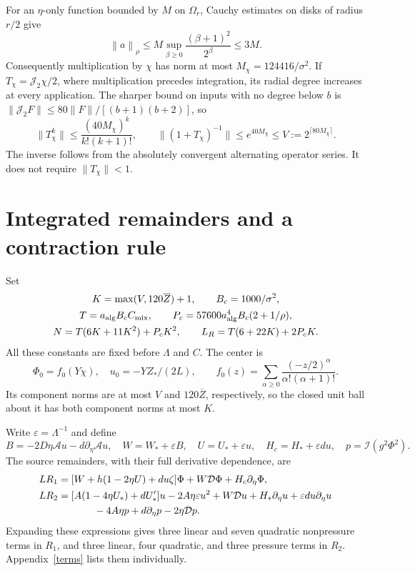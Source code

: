 \documentclass[11pt]{article}
\newcommand{\norm}[1]{\left\lVert#1\right\rVert_\rho}
\newcommand{\Av}{\mathcal A}
\newcommand{\DY}{\mathcal D}
\newcommand{\J}{\mathcal J}
\newcommand{\Int}{\mathcal I}
\begin{document}
For an $\eta$-only function bounded by $M$ on $\Omega_r$, Cauchy estimates
on disks of radius $r/2$ give
\[
\norm{a}\le M\sup_{\beta\ge0}\frac{(\beta+1)^2}{2^\beta}\le3M.
\]
Consequently multiplication by $\chi$ has norm at most
$M_\chi=124416/\sigma^2$. If $T_\chi=\J_2\chi/2$, where multiplication
precedes integration, its radial degree increases at every application.
The sharper bound on inputs with no degree below $b$ is
$\|\J_2F\|\le80\|F\|/[(b+1)(b+2)]$, so
\[
\|T_\chi^k\|\le\frac{(40M_\chi)^k}{k!(k+1)!},\qquad
\|(1+T_\chi)^{-1}\|\le e^{40M_\chi}\le V:=2^{\lceil80M_\chi\rceil}.
\]
The inverse follows from the absolutely convergent alternating operator
series. It does not require $\|T_\chi\|<1$.

\section{Integrated remainders and a contraction rule}
Set
\begin{equation}\label{constants}
\begin{gathered}
K=\max(V,120\overline Z)+1,\qquad B_c=1000/\sigma^2,\\
T=a_{\rm alg}B_c C_{\rm mix},\qquad
P_c=57600a_{\rm alg}^4B_c(2+1/\rho),\\
N=T(6K+11K^2)+P_cK^2,\qquad
L_R=T(6+22K)+2P_cK.
\end{gathered}
\end{equation}
All these constants are fixed before $\Lambda$ and $C$.
The center is
\[
\Phi_0=f_0(Y\chi),\quad u_0=-YZ_*/(2L),\qquad
f_0(z)=\sum_{\alpha\ge0}\frac{(-z/2)^\alpha}{\alpha!(\alpha+1)!}.
\]
Its component norms are at most $V$ and $120\overline Z$, respectively,
so the closed unit ball about it has both component norms at most $K$.

Write $\varepsilon=\Lambda^{-1}$ and define
\[
B=-2D\eta\Av u-d\partial_\eta\Av u,\quad
W=W_*+\varepsilon B,\quad U=U_*+\varepsilon u,\quad
H_c=H_*+\varepsilon du,\quad p=\Int(g^2\Phi^2).
\]
The source remainders, with their full derivative dependence, are
\begin{align}
LR_1={}&[W+h(1-2\eta U)+du\zeta]\Phi+W\DY\Phi+H_c\partial_\eta\Phi,
\label{r1}\\
LR_2={}&[A(1-4\eta U_*)+dU_*']u-2A\eta\varepsilon u^2
+W\DY u+H_*\partial_\eta u+\varepsilon du\partial_\eta u\notag\\
&\hspace{8mm}-4A\eta p+d\partial_\eta p-2\eta\DY p.\label{r2}
\end{align}
Expanding these expressions gives three linear and seven quadratic
nonpressure terms in $R_1$, and three linear, four quadratic, and three
pressure terms in $R_2$. Appendix~\ref{terms} lists them individually.
\end{document}
